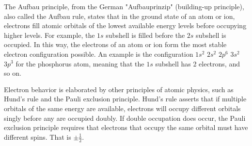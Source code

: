 \begin{chembox}{}
{The Aufbau principle, from the German "Aufbauprinzip" (building-up principle), also called the Aufbau rule, states that in the ground state of an atom or ion, electrons fill atomic orbitals of the lowest available energy levels before occupying higher levels. For example, the $1s$ subshell is filled before the $2s$ subshell is occupied. In this way, the electrons of an atom or ion form the most stable electron configuration possible. An example is the configuration $1s^2$ $2s^2$ $2p^6$ $3s^2$ $3p^3$ for the phosphorus atom, meaning that the $1s$ subshell has 2 electrons, and so on.

Electron behavior is elaborated by other principles of atomic physics, such as Hund's rule and the Pauli exclusion principle. Hund's rule asserts that if multiple orbitals of the same energy are available, electrons will occupy different orbitals singly before any are occupied doubly. If double occupation does occur, the Pauli exclusion principle requires that electrons that occupy the same orbital must have different spins. That is $\pm\frac{1}{2}$.
\begin{center}
\end{center}}
\end{chembox}
